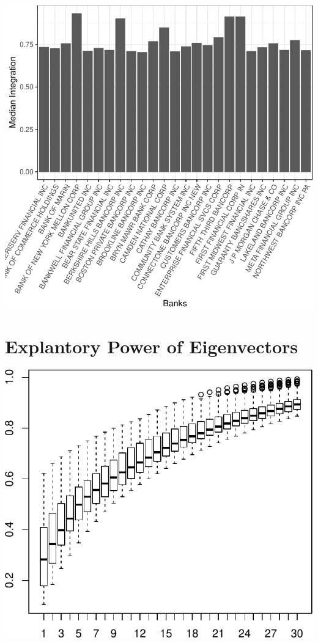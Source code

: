 \documentclass[11pt,]{article}
\begin{document}
\begin{center}\includegraphics{AC_US_Bank_Int_Results_1_files/figure-latex/most_int-1} \end{center}

\section{Explantory Power of
Eigenvectors}\label{explantory-power-of-eigenvectors}

\begin{center}\includegraphics{AC_US_Bank_Int_Results_1_files/figure-latex/expl_power_eig_vec-1} \end{center}
\end{document}
